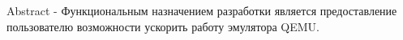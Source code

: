 Abstract - Функциональным назначением разработки является предоставление пользователю возможности ускорить работу эмулятора QEMU.
